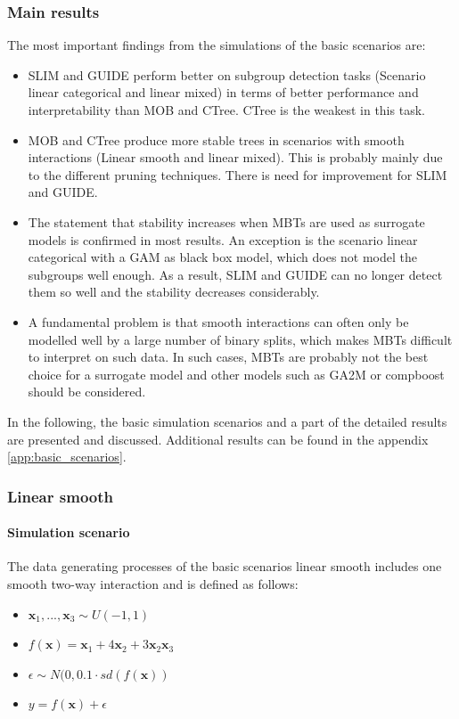 \subsubsection{Main results}
The most important findings from the simulations of the basic scenarios are:
\begin{itemize}
    \item SLIM and GUIDE perform better on subgroup detection tasks (Scenario linear categorical and linear mixed) in terms of better performance and interpretability than MOB and CTree. CTree is the weakest in this task.
    \item MOB and CTree produce more stable trees in scenarios with smooth interactions (Linear smooth and linear mixed). This is probably mainly due to the different pruning techniques. There is need for improvement for SLIM and GUIDE.
    \item The statement that stability increases when MBTs are used as surrogate models is confirmed in most results. An exception is the scenario linear categorical with a GAM as black box model, which does not model the subgroups well enough. As a result, SLIM and GUIDE can no longer detect them so well and the stability decreases considerably.
    \item A fundamental problem is that smooth interactions can often only be modelled well by a large number of binary splits, which makes MBTs difficult to interpret on such data. In such cases, MBTs are probably not the best choice for a surrogate model and other models such as GA2M \citep{Lou.2013} or compboost \citep{Schalk.2018} should be considered.

\end{itemize}

In the following, the basic simulation scenarios and a part of the detailed  results are presented and discussed. Additional results can be found in the appendix \ref{app:basic_scenarios}.
\subsubsection{Linear smooth} 

\paragraph{Simulation scenario}
The data generating processes of the basic scenarios linear smooth includes one smooth two-way interaction and is defined as follows:

\begin{itemize}
    \item $\textbf{x}_1,..., \textbf{x}_{3} \sim U(-1,1)$
    \item $ f(\textbf{x}) = \textbf{x}_1 + 4   \textbf{x}_2 + 3   \textbf{x}_2   \textbf{x}_3 $
    \item $\epsilon \sim N(0, 0.1 \cdot sd(f(\textbf{x}))$
    \item $y = f(\textbf{x}) + \epsilon$
\end{itemize}    

